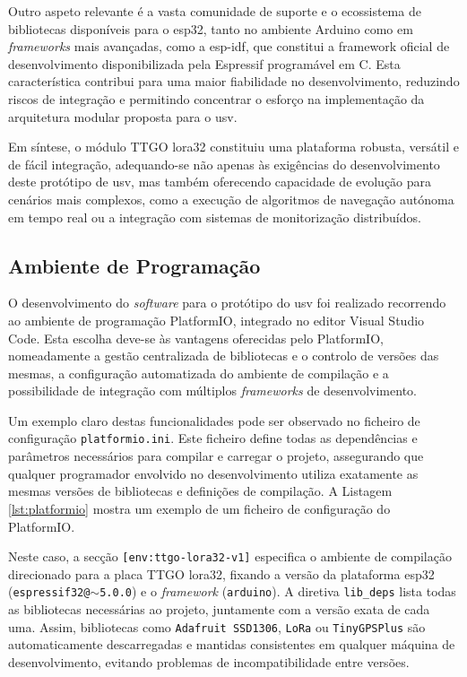 Outro aspeto relevante é a vasta comunidade de suporte e o ecossistema de bibliotecas disponíveis para o \gls{esp32}, tanto no ambiente Arduino como em \emph{frameworks} mais avançadas, como a \gls{esp-idf}, que constitui a framework oficial de desenvolvimento disponibilizada pela Espressif programável em C. Esta característica contribui para uma maior fiabilidade no desenvolvimento, reduzindo riscos de integração e permitindo concentrar o esforço na implementação da arquitetura modular proposta para o \gls{usv}.

Em síntese, o módulo TTGO \gls{lora}32 constituiu uma plataforma robusta, versátil e de fácil integração, adequando-se não apenas às exigências do desenvolvimento deste protótipo de \gls{usv}, mas também oferecendo capacidade de evolução para cenários mais complexos, como a execução de algoritmos de navegação autónoma em tempo real ou a integração com sistemas de monitorização distribuídos.

\subsection{Ambiente de Programação}
\label{subsec:ambiente-programacao}

O desenvolvimento do \emph{software} para o protótipo do \gls{usv} foi realizado recorrendo ao ambiente de programação PlatformIO, integrado no editor Visual Studio Code. Esta escolha deve-se às vantagens oferecidas pelo PlatformIO, nomeadamente a gestão centralizada de bibliotecas e o controlo de versões das mesmas, a configuração automatizada do ambiente de compilação e a possibilidade de integração com múltiplos \emph{frameworks} de desenvolvimento.  

Um exemplo claro destas funcionalidades pode ser observado no ficheiro de configuração \texttt{platformio.ini}. Este ficheiro define todas as dependências e parâmetros necessários para compilar e carregar o projeto, assegurando que qualquer programador envolvido no desenvolvimento utiliza exatamente as mesmas versões de bibliotecas e definições de compilação. A Listagem \ref{lst:platformio} mostra um exemplo de um ficheiro de configuração do PlatformIO.



Neste caso, a secção \texttt{[env:ttgo-lora32-v1]} especifica o ambiente de compilação direcionado para a placa TTGO \gls{lora}32, fixando a versão da plataforma \gls{esp32} (\texttt{espressif32@$\sim$5.0.0}) e o \emph{framework} (\texttt{arduino}). A diretiva \texttt{lib\_deps} lista todas as bibliotecas necessárias ao projeto, juntamente com a versão exata de cada uma. Assim, bibliotecas como \texttt{Adafruit SSD1306}, \texttt{LoRa} ou \texttt{TinyGPSPlus} são automaticamente descarregadas e mantidas consistentes em qualquer máquina de desenvolvimento, evitando problemas de incompatibilidade entre versões.  

